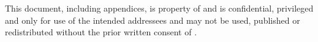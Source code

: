 \renewcommand{\abstractname}{Copyright \textcopyright \xspace \the\year \xspace \paperuniversity}

\begin{center}

This document, including appendices, is property of \paperuniversity \xspace and is confidential, privileged and only for use of the intended addressees and may not be used, published or redistributed without the prior written consent of \paperuniversity \xspace.

\end{center}
